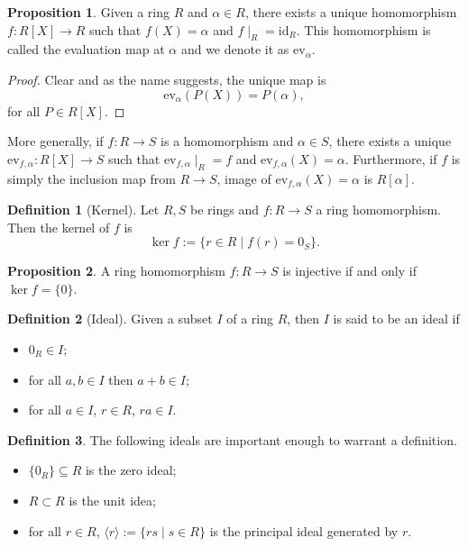 \documentclass[]{article}
\theoremstyle{definition}
\theoremstyle{definition}
\newtheorem{definition}{Definition}[section]
\newtheorem{proposition}{Proposition}[section]
\begin{document}
\begin{proposition}
  Given a ring \(R\) and \(\alpha \in R\), there exists a unique homomorphism 
  \(f : R[X] \to R\) such that \(f(X) = \alpha\) and \(f\mid_R = \text{id}_R\).
  This homomorphism is called the evaluation map at \(\alpha\) and we denote it 
  as \(\text{ev}_\alpha\).
\end{proposition}
\begin{proof}
  Clear and as the name suggests, the unique map is 
  \[\text{ev}_\alpha(P(X)) = P(\alpha),\]
  for all \(P \in R[X]\).
\end{proof}

More generally, if \(f : R \to S\) is a homomorphism and \(\alpha \in S\), there 
exists a unique \(\text{ev}_{f, \alpha} : R[X] \to S\) such that
\(\text{ev}_{f, \alpha} \mid_R = f\) and \(\text{ev}_{f, \alpha}(X) = \alpha\). 
Furthermore, if \(f\) is simply the inclusion map from \(R \to S\), image of 
\(\text{ev}_{f, \alpha}(X) = \alpha\) is \(R[\alpha]\).

\begin{definition}[Kernel]
  Let \(R, S\) be rings and \(f : R \to S\) a ring homomorphism. Then the 
  kernel of \(f\) is 
  \[\ker f := \{r \in R \mid f(r) = 0_S\}.\]
\end{definition}

\begin{proposition}
  A ring homomorphism \(f : R \to S\) is injective if and only if 
  \(\ker f = \{0\}\).
\end{proposition}

\begin{definition}[Ideal]
  Given a subset \(I\) of a ring \(R\), then \(I\) is said to be an ideal if 
  \begin{itemize}
    \item \(0_R \in I\);
    \item for all \(a, b \in I\) then \(a + b \in I\);
    \item for all \(a \in I\), \(r \in R\), \(ra \in I\).
  \end{itemize}
\end{definition}

\begin{definition}
  The following ideals are important enough to warrant a definition.
  \begin{itemize}
    \item \(\{0_R\} \subseteq R\) is the zero ideal;
    \item \(R \subset R\) is the unit idea;
    \item for all \(r \in R\), \(\langle r \rangle := \{rs \mid s \in R\}\) 
      is the principal ideal generated by \(r\).
  \end{itemize}
\end{definition}
\end{document}
